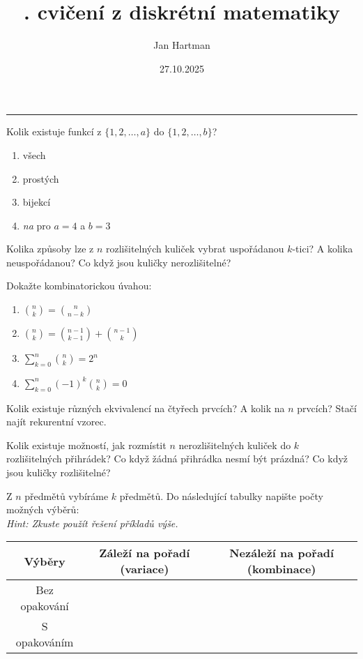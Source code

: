 \documentclass[10pt]{article}
\title{\tutnum. cvičení z diskrétní matematiky}
\author{Jan Hartman}
\date{27.10.2025}
\newcommand{\titlerule}{%
    \noindent %
    \makebox[\textwidth]{\large \thetitle \hfill \thedate}
    \rule{\textwidth}{0.4pt}%
}
\begin{document}
\titlerule

\begin{problem}
Kolik existuje funkcí z $\{1,2,\ldots,a\}$ do $\{1,2,\ldots,b\}$?
\begin{enumerate}[label=\alph*)]
    \item všech
    \item prostých
    \item bijekcí
    \item \textit{na} pro $a = 4$ a $b=3$ 
\end{enumerate}
\end{problem}

\begin{problem}
Kolika způsoby lze z $n$ rozlišitelných kuliček vybrat uspořádanou $k$-tici? A kolika neuspořádanou? Co když jsou kuličky nerozlišitelné?
\end{problem}

\begin{problem}
Dokažte kombinatorickou úvahou:
\begin{enumerate}[label=\alph*)]
    \item $\binom{n}{k} = \binom{n}{n-k}$
    \item $\binom{n}{k} = \binom{n-1}{k-1} + \binom{n-1}{k}$
    \item $\sum_{k=0}^{n}\binom{n}{k} = 2^n$
    \item $\sum_{k=0}^{n}(-1)^k\binom{n}{k} = 0$
\end{enumerate}
\end{problem}

\begin{problem}
Kolik existuje různých ekvivalencí na čtyřech prvcích? A kolik na $n$ prvcích? Stačí najít rekurentní vzorec.
\end{problem}

\begin{problem}
Kolik existuje možností, jak rozmístit $n$ nerozlišitelných kuliček do $k$ rozlišitelných přihrádek? Co když žádná přihrádka nesmí být prázdná? Co když jsou kuličky rozlišitelné?
\end{problem}

\begin{problem}[Klasifikace]
Z $n$ předmětů vybíráme $k$ předmětů. Do následující tabulky napište počty možných výběrů: \\
\textit{Hint: Zkuste použít řešení příkladů výše.}

\vspace{5pt}
\begin{tabular}{|c|c|c|}
\hline
    Výběry & Záleží na pořadí (variace) & Nezáleží na pořadí (kombinace) \\
\hline
    Bez opakování &  &  \\
\hline
    S opakováním &  &  \\
\hline
\end{tabular}

\end{problem}
\end{document}

